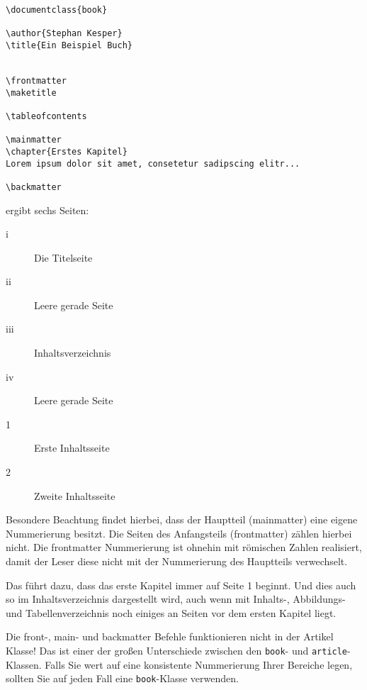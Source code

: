 \footnotesize
\begin{verbatim}
\documentclass{book}

\author{Stephan Kesper}
\title{Ein Beispiel Buch}


\frontmatter
\maketitle

\tableofcontents

\mainmatter
\chapter{Erstes Kapitel}
Lorem ipsum dolor sit amet, consetetur sadipscing elitr...

\backmatter

\end{verbatim}
\normalsize
ergibt sechs Seiten:
\begin{description}
\item[i] Die Titelseite
\item[ii] Leere gerade Seite
\item[iii] Inhaltsverzeichnis
\item[iv] Leere gerade Seite
\item[1] Erste Inhaltsseite
\item[2] Zweite Inhaltsseite
\end{description}



Besondere Beachtung findet hierbei, dass der Hauptteil (mainmatter) eine eigene Nummerierung besitzt. Die Seiten des Anfangsteils (frontmatter) zählen hierbei nicht. Die frontmatter Nummerierung ist ohnehin mit römischen Zahlen realisiert, damit der Leser diese nicht mit der Nummerierung des Hauptteils verwechselt. 
  

Das führt dazu, dass das erste Kapitel immer auf Seite 1 beginnt. Und dies auch so im Inhaltsverzeichnis dargestellt wird, auch wenn mit Inhalts-, Ab\-bil\-dungs- und Tabellenverzeichnis noch einiges an Seiten vor dem ersten Kapitel liegt. 

\begin{fancyquotes}
Die front-, main- und backmatter Befehle funktionieren nicht in der Artikel Klasse! Das ist einer der großen Unterschiede zwischen den \texttt{book}- und \texttt{article}-Klassen. Falls Sie wert auf eine konsistente Nummerierung Ihrer Bereiche legen, sollten Sie auf jeden Fall eine \texttt{book}-Klasse verwenden.
\end{fancyquotes}

